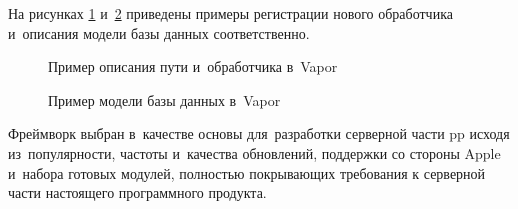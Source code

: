 На рисунках \ref{sec:development:arch:pp:vapor:code:route} и~\ref{sec:development:arch:pp:vapor:code:db} приведены примеры регистрации нового обработчика и~описания модели базы данных соответственно.

\begin{figure}[h]
  
  \caption{Пример описания пути и~обработчика в~Vapor}
  \label{sec:development:arch:pp:vapor:code:route}
\end{figure}

\begin{figure}[h]
	
   \caption{Пример модели базы данных в~Vapor}
   \label{sec:development:arch:pp:vapor:code:db}
\end{figure}

Фреймворк выбран в~качестве основы для~разработки серверной части \gls{pp} исходя из~популярности, частоты и~качества обновлений, поддержки со стороны Apple и~набора готовых модулей, полностью покрывающих требования к серверной части настоящего программного продукта.